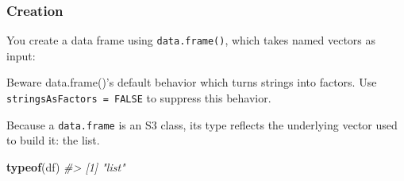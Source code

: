 \documentclass[]{book}
\newenvironment{Shaded}{\begin{snugshade}}{\end{snugshade}}
\newcommand{\CommentTok}[1]{\textcolor[rgb]{0.56,0.35,0.01}{\textit{#1}}}
\newcommand{\DataTypeTok}[1]{\textcolor[rgb]{0.13,0.29,0.53}{#1}}
\newcommand{\DecValTok}[1]{\textcolor[rgb]{0.00,0.00,0.81}{#1}}
\newcommand{\KeywordTok}[1]{\textcolor[rgb]{0.13,0.29,0.53}{\textbf{#1}}}
\newcommand{\NormalTok}[1]{#1}
\newcommand{\OperatorTok}[1]{\textcolor[rgb]{0.81,0.36,0.00}{\textbf{#1}}}
\newcommand{\OtherTok}[1]{\textcolor[rgb]{0.56,0.35,0.01}{#1}}
\newcommand{\StringTok}[1]{\textcolor[rgb]{0.31,0.60,0.02}{#1}}
\theoremstyle{definition}
\theoremstyle{definition}
\theoremstyle{definition}
\theoremstyle{remark}
\let\BeginKnitrBlock\begin \let\EndKnitrBlock\end
\begin{document}
\hypertarget{creation}{%
\subsubsection{Creation}\label{creation}}

You create a data frame using \texttt{data.frame()}, which takes named
vectors as input:

\begin{Shaded}
\end{Shaded}

\BeginKnitrBlock{rmdwarning}
Beware data.frame()'s default behavior which turns strings into factors.
Use \texttt{stringsAsFactors\ =\ FALSE} to suppress this behavior.
\EndKnitrBlock{rmdwarning}

\begin{Shaded}
\end{Shaded}

Because a \texttt{data.frame} is an S3 class, its type reflects the
underlying vector used to build it: the list.

\begin{Shaded}
\begin{Highlighting}[]
\KeywordTok{typeof}\NormalTok{(df)}
\CommentTok{#> [1] "list"}
\end{Highlighting}
\end{Shaded}
\end{document}
